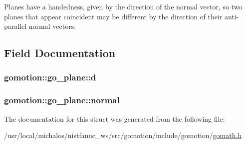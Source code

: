 Planes have a handedness, given by the direction of the normal vector, so two planes that appear coincident may be different by the direction of their anti-\/parallel normal vectors. 

\subsection{Field Documentation}
\hypertarget{structgomotion_1_1go__plane_a6397e783bfdfab04419cf41b809bc9e7}{
\subsubsection[{d}]{ gomotion\-::go\-\_\-plane\-::d}}\label{structgomotion_1_1go__plane_a6397e783bfdfab04419cf41b809bc9e7}
\hypertarget{structgomotion_1_1go__plane_a94d5e5a023dc4f396e2a60b9d396c427}{
\subsubsection[{normal}]{ gomotion\-::go\-\_\-plane\-::normal}}\label{structgomotion_1_1go__plane_a94d5e5a023dc4f396e2a60b9d396c427}


The documentation for this struct was generated from the following file\-:\begin{DoxyCompactItemize}
\item 
/usr/local/michalos/nistfanuc\-\_\-ws/src/gomotion/include/gomotion/\hyperlink{gomath_8h}{gomath.\-h}\end{DoxyCompactItemize}
